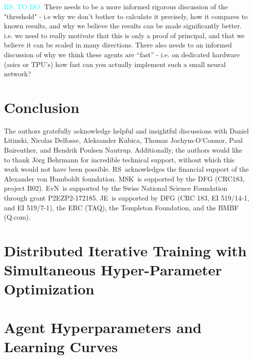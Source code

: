 \documentclass[twocolumn,preprintnumbers,amsmath,amssymb,notitlepage,nofootinbib,longbibliography,superscriptaddress,aps,pra,10pt]{revtex4-1}
\newcommand{\ryan}[1]{\textcolor{Cyan}{RS: #1}}
\begin{document}
	\ryan{TO DO:} There needs to be a more informed rigorous discussion of the "threshold" - i.e why we don't bother to calculate it precisely, how it compares to known results, and why we believe the results can be made significantly better.
	i.e. we need to really motivate that this is only a proof of principal, and that we believe it can be scaled in many directions.
	There also needs to an informed discussion of why we think these agents are ``fast'' - i.e. on dedicated hardware (asics or TPU's) how fast can you actually implement such a small neural network?

\section{Conclusion}\label{s:conclusions}

	\begin{acknowledgments}
		The authors gratefully acknowledge helpful and insightful discussions with Daniel Litinski, Nicolas Delfosse, Aleksander Kubica, Thomas Jochym-O'Connor,
		Paul Baireuther, and Hendrik Poulsen Nautrup.
		Additionally, the authors would like to thank J\"{o}rg Behrmann for incredible technical support, without which this work would not have been possible.
		RS\ acknowledges the financial support of the Alexander von Humboldt foundation.
		MSK\ is supported by the DFG (CRC183, project B02).
		EvN\ is supported by the Swiss National Science Foundation through grant P2EZP2-172185.
		JE\ is supported by DFG (CRC 183, EI 519/14-1, and EI 519/7-1), the ERC (TAQ), the Templeton Foundation, and the BMBF (Q.com).
	\end{acknowledgments}

\appendix

\section{Distributed Iterative Training with Simultaneous Hyper-Parameter Optimization}\label{A:training}

\section{Agent Hyperparameters and Learning Curves}\label{A:parameters}


\end{document}
